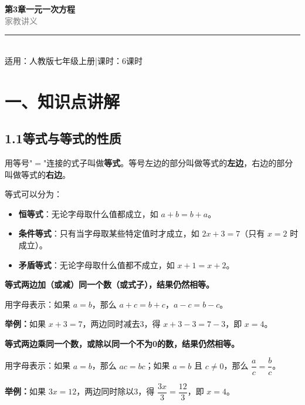 \documentclass[12pt, a4paper]{ctexart}
\begin{document}
\begin{center}
{\Huge\bfseries\textcolor{mainblue}{第3章\quad 一元一次方程}}\\[12pt]
{\Large\textcolor{gray}{家\quad 教\quad 讲\quad 义}}\\[8pt]
\rule{0.6\textwidth}{1pt}\\[8pt]
{\normalsize 适用：人教版\quad 七年级上册\quad |\quad 课时：6课时}
\end{center}
\vspace{10pt}

\section*{\textcolor{mainblue}{一、知识点讲解}}

\subsection*{1.1\quad 等式与等式的性质}

\begin{knowledgebox}[等式的概念]
用等号"$=$"连接的式子叫做\textbf{等式}。等号左边的部分叫做等式的\textbf{左边}，右边的部分叫做等式的\textbf{右边}。

等式可以分为：
\begin{itemize}[nosep]
  \item \textbf{恒等式}：无论字母取什么值都成立，如 $a+b=b+a$。
  \item \textbf{条件等式}：只有当字母取某些特定值时才成立，如 $2x+3=7$（只有 $x=2$ 时成立）。
  \item \textbf{矛盾等式}：无论字母取什么值都不成立，如 $x+1=x+2$。
\end{itemize}
\end{knowledgebox}

\begin{knowledgebox}[等式的性质1]
\textbf{等式两边加（或减）同一个数（或式子），结果仍然相等。}

用字母表示：如果 $a=b$，那么 $a+c=b+c$，$a-c=b-c$。

\textbf{举例：}如果 $x+3=7$，两边同时减去3，得 $x+3-3=7-3$，即 $x=4$。
\end{knowledgebox}

\begin{knowledgebox}[等式的性质2]
\textbf{等式两边乘同一个数，或除以同一个不为0的数，结果仍然相等。}

用字母表示：如果 $a=b$，那么 $ac=bc$；如果 $a=b$ 且 $c\neq 0$，那么 $\dfrac{a}{c}=\dfrac{b}{c}$。

\textbf{举例：}如果 $3x=12$，两边同时除以3，得 $\dfrac{3x}{3}=\dfrac{12}{3}$，即 $x=4$。
\end{knowledgebox}
\end{document}
